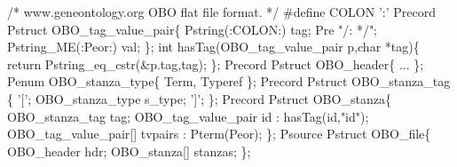 \begin{code}
/* www.geneontology.org OBO flat file format. */
\mbox{}
#define COLON ':'
\mbox{}
Precord Pstruct OBO\_tag\_value\_pair\{
  Pstring(:COLON:) tag;  
  Pre "/: */"; 
  Pstring\_ME(:Peor:) val;
\};
\mbox{}
int hasTag(OBO\_tag\_value\_pair p,char *tag)\{
  return Pstring\_eq\_cstr(&p.tag,tag); 
\};
\mbox{}
Precord Pstruct OBO\_header\{
  ...
\};
\mbox{}
Penum OBO\_stanza\_type\{ Term, Typeref \};
\mbox{}
Precord Pstruct OBO\_stanza\_tag \{
    '['; OBO\_stanza\_type s\_type; ']';
\};
\mbox{}
Precord Pstruct OBO\_stanza\{
  OBO\_stanza\_tag       tag;
  OBO\_tag\_value\_pair   id      : hasTag(id,"id");
  OBO\_tag\_value\_pair[] tvpairs : Pterm(Peor);
\};
\mbox{}
Psource Pstruct OBO\_file\{
  OBO\_header hdr;
  OBO\_stanza[] stanzas;
\};
\end{code}
